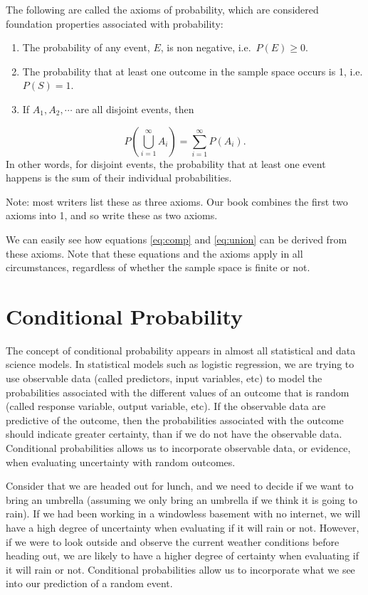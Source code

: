 \documentclass[
]{book}
\providecommand{\tightlist}{%
  \setlength{\itemsep}{0pt}\setlength{\parskip}{0pt}}
\begin{document}
The following are called the axioms of probability, which are considered foundation properties associated with probability:

\begin{enumerate}
\def\labelenumi{\arabic{enumi}.}
\tightlist
\item
  The probability of any event, \(E\), is non negative, i.e.~\(P(E) \geq 0\).
\item
  The probability that at least one outcome in the sample space occurs is 1, i.e.\(P(S) = 1\).
\item
  If \(A_1, A_2, \cdots\) are all disjoint events, then
\end{enumerate}

\[
P(\bigcup\limits_{i=1}^{\infty} A_{i}) = \sum_{i=1}^{\infty} P(A_i).
\]
In other words, for disjoint events, the probability that at least one event happens is the sum of their individual probabilities.

Note: most writers list these as three axioms. Our book combines the first two axioms into 1, and so write these as two axioms.

We can easily see how equations \eqref{eq:comp} and \eqref{eq:union} can be derived from these axioms. Note that these equations and the axioms apply in all circumstances, regardless of whether the sample space is finite or not.

\hypertarget{condprob}{%
\section{Conditional Probability}\label{condprob}}

The concept of conditional probability appears in almost all statistical and data science models. In statistical models such as logistic regression, we are trying to use observable data (called predictors, input variables, etc) to model the probabilities associated with the different values of an outcome that is random (called response variable, output variable, etc). If the observable data are predictive of the outcome, then the probabilities associated with the outcome should indicate greater certainty, than if we do not have the observable data. Conditional probabilities allows us to incorporate observable data, or evidence, when evaluating uncertainty with random outcomes.

Consider that we are headed out for lunch, and we need to decide if we want to bring an umbrella (assuming we only bring an umbrella if we think it is going to rain). If we had been working in a windowless basement with no internet, we will have a high degree of uncertainty when evaluating if it will rain or not. However, if we were to look outside and observe the current weather conditions before heading out, we are likely to have a higher degree of certainty when evaluating if it will rain or not. Conditional probabilities allow us to incorporate what we see into our prediction of a random event.
\end{document}
